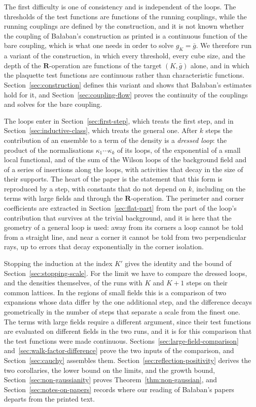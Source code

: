 \documentclass[11pt]{preprint}
\numberwithin{equation}{section}
\theoremstyle{definition}
\theoremstyle{remark}
\theoremstyle{plain}
\begin{document}
The first difficulty is one of consistency and is independent of the loops. The thresholds of the test functions are functions of the running couplings, while the running couplings are defined by the construction, and it is not known whether the coupling of Ba{\l}aban's construction as printed is a continuous function of the bare coupling, which is what one needs in order to solve $g_K = \bar g$. We therefore run a variant of the construction, in which every threshold, every cube size, and the depth of the $\mathbf R$-operation are functions of the target $(K, \bar g)$ alone, and in which the plaquette test functions are continuous rather than characteristic functions. Section~\ref{sec:construction} defines this variant and shows that Ba{\l}aban's estimates hold for it, and Section~\ref{sec:coupling-flow} proves the continuity of the couplings and solves for the bare coupling.

The loops enter in Section~\ref{sec:first-step}, which treats the first step, and in Section~\ref{sec:inductive-class}, which treats the general one. After $k$ steps the contribution of an ensemble to a term of the density is a \emph{dressed loop}: the product of the normalisations $\kappa_1 \cdots \kappa_k$ of its loops, of the exponential of a small local functional, and of the sum of the Wilson loops of the background field and of a series of insertions along the loops, with activities that decay in the size of their supports. The heart of the paper is the statement that this form is reproduced by a step, with constants that do not depend on $k$, including on the terms with large fields and through the $\mathbf R$-operation. The perimeter and corner coefficients are extracted in Section~\ref{sec:flat-part} from the part of the loop's contribution that survives at the trivial background, and it is here that the geometry of a general loop is used: away from its corners a loop cannot be told from a straight line, and near a corner it cannot be told from two perpendicular rays, up to errors that decay exponentially in the corner isolation.

Stopping the induction at the index $K'$ gives the identity and the bound of Section~\ref{sec:stopping-scale}. For the limit we have to compare the dressed loops, and the densities themselves, of the runs with $K$ and $K + 1$ steps on their common lattices. In the regions of small fields this is a comparison of two expansions whose data differ by the one additional step, and the difference decays geometrically in the number of steps that separate a scale from the finest one. The terms with large fields require a different argument, since their test functions are evaluated on different fields in the two runs, and it is for this comparison that the test functions were made continuous. Sections~\ref{sec:large-field-comparison} and~\ref{sec:walk-factor-difference} prove the two inputs of the comparison, and Section~\ref{sec:cauchy} assembles them. Section~\ref{sec:reflection-positivity} derives the two corollaries, the lower bound on the limits, and the growth bound, Section~\ref{sec:non-gaussianity} proves Theorem~\ref{thm:non-gaussian}, and Section~\ref{sec:notes-on-papers} records where our reading of Ba{\l}aban's papers departs from the printed text.
\end{document}

